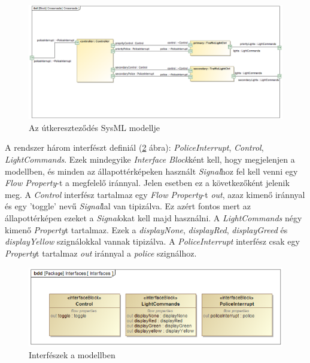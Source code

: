 \begin{figure}[!ht]
	\centering
	\includegraphics[width=15cm, keepaspectratio]{figures/contribution/Crossroads.png}
	\caption{Az útkereszteződés SysML modellje}
	\label{fig:Crossroads}
\end{figure}

A rendszer három interfészt definiál (\ref{fig:Interfaces} ábra): \emph{PoliceInterrupt}, \emph{Control}, \emph{LightCommands}. Ezek mindegyike \emph{Interface Block}ként kell, hogy megjelenjen a modellben, és minden az állapottérképeken használt \emph{Signal}hoz fel kell venni egy \emph{Flow Property}-t a megfelelő iránnyal. Jelen esetben ez a következőként jelenik meg. A \emph{Control} interfész tartalmaz egy \emph{Flow Property}-t \emph{out}, azaz kimenő iránnyal és egy 'toggle' nevű \emph{Signal}lal van tipizálva. Ez azért fontos mert az állapottérképen ezeket a \emph{Signal}okat kell majd használni. A \emph{LightCommands} négy kimenő \emph{Property}t tartalmaz. Ezek a \emph{displayNone}, \emph{displayRed}, \emph{displayGreed} és \emph{displayYellow} szignálokkal vannak tipizálva. A \emph{PoliceInterrupt} interfész csak egy \emph{Property}t tartalmaz \emph{out} iránnyal a \emph{police} szignálhoz.

\begin{figure}[!ht]
	\centering
	\includegraphics[width=15cm, keepaspectratio]{figures/contribution/Interfaces.png}
	\caption{Interfészek a modellben}
	\label{fig:Interfaces}
\end{figure}

